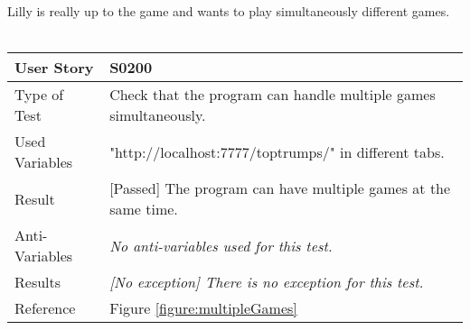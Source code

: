 Lilly is really up to the game and wants to play simultaneously different games.\\
\vspace{0.2cm}\\  
\begin{tabular}{l | p{12cm}}
User Story & \textbf{S0200}\\ \hline
Type of Test & Check that the program can handle multiple games simultaneously.\\ \hline
Used Variables & "http://localhost:7777/toptrumps/" in different tabs.\\ \hline
Result & [Passed] The program can have multiple games at the same time.\\ \hline
Anti-Variables & \emph{No anti-variables used for this test.}\\ \hline
Results & \emph{[No exception] There is no exception for this test.}\\ \hline
Reference & Figure \ref{figure:multipleGames} \\ \hline
\end{tabular}\\

